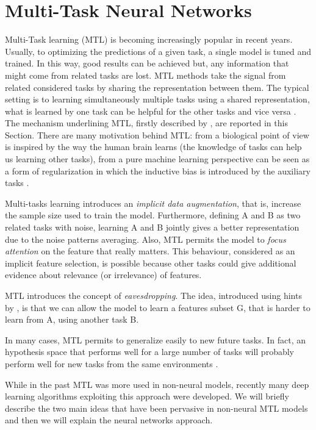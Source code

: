 \section{Multi-Task Neural Networks}\label{sec:MTLsection}
Multi-Task learning (MTL) is becoming increasingly popular in recent years.
Usually, to optimizing the predictions of a given task, a single model is
tuned and trained. In this way, good results can be achieved but, any
information that might come from related tasks are lost. MTL methods take
the signal from related considered tasks by sharing the
representation between them. The typical setting is to learning simultaneously multiple
tasks using a shared representation, what is learned by one
task can be helpful for the other tasks and vice versa \cite{Caruana97}. 
The mechanism underlining MTL, firstly described by \cite{Caruana97}, are reported in this Section.
There are many motivation behind MTL: from a biological point of view is
inspired by the way the human brain learns (the knowledge of tasks can help us
learning other tasks), from a pure machine learning perspective
can be seen as a form of regularization in which the inductive bias is
introduced by the auxiliary tasks \cite{Ruder2017}. 

Multi-tasks learning introduces an \emph{implicit data augmentation}, that is, increase the sample size used to train the model. Furthermore, defining A and B as two related tasks with noise, learning A and B jointly gives a better representation due to the noise patterns averaging.
Also, MTL permits the model to \emph{focus attention} on the feature that really matters. This behaviour, considered as an implicit feature selection, is possible because other tasks could give additional evidence about relevance (or irrelevance) of features. 

MTL introduces the concept of \emph{eavesdropping}. The idea, introduced using hints by \cite{AbuMostafa1990}, is that we can allow the model to learn a features subset G, that is harder to learn from A, using another task B. 

In many cases, MTL permits to generalize easily to new future tasks. In fact, an hypothesis space that performs well for a large number of tasks will probably perform well for new tasks from the same environments \cite{Ruder2017}. 

While in the past MTL
was more used in non-neural models, recently many deep learning algorithms exploiting this approach were developed. We will briefly describe the two main ideas that have been pervasive in non-neural MTL models and then we will explain the neural networks approach.

